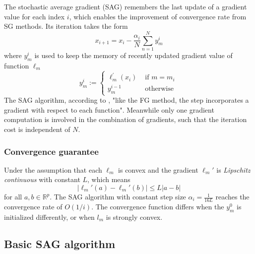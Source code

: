 The stochastic average gradient (SAG) remembers the last update of a gradient value for each index $i$, which enables the improvement of convergence rate from SG methods. Its iteration takes the form
\begin{equation}
x_{i+1} = x_i - \frac{\alpha_i}{N} \sum^N_{n=1}y_{m}^{i}
\end{equation}
where $y_{m}^{i}$ is used to keep the memory of recently updated gradient value of function $\ell_m$
\begin{equation}
y_{m}^{i}:=\left\{\begin{array}{ll}
    \ell_{m}^{\prime}\left(x_{i}\right) & \text { if } m=m_{i} \\
    y_{m}^{i-1} & \text { otherwise }
    \end{array}\right.
\end{equation}
The SAG algorithm, according to \citeauthor{schmidtMinimizingFiniteSums2016}, "like the FG method, the step incorporates a gradient with respect to each function". Meanwhile only one gradient computation is involved in the combination of gradients, such that the iteration cost is independent of $N$.

\subsubsection{Convergence guarantee}

Under the assumption that each $\ell_m$ is convex and the gradient $\ell_m\prime$ is \textit{Lipschitz continuous} with constant $L$, which means
\begin{equation}
|\ell_m\prime (a) - \ell_m\prime (b)| \leq L|a-b|
\end{equation}
for all $a,b \in \mathbb{R}^p$.
The SAG algorithm with constant step size $\alpha_i = \frac{1}{16L}$ reaches the convergence rate of $O(1/i)$. The convergence function differs when the $y_m^0$ is initialized differently, or when $l_m$ is strongly convex.


\subsection{Basic SAG algorithm}

